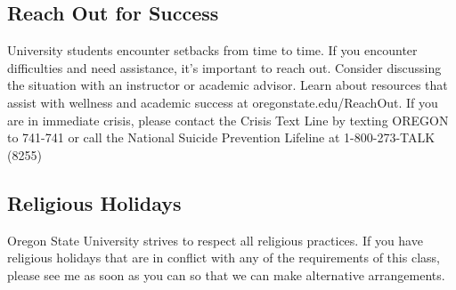 \documentclass[10pt]{article}
\begin{document}
\subsection*{Reach Out for Success}
University students encounter setbacks from time to time. If you encounter difficulties and need assistance, it’s important to reach out. Consider discussing the situation with an instructor or academic advisor. Learn about resources that assist with wellness and academic success at oregonstate.edu/ReachOut. If you are in immediate crisis, please contact the Crisis Text Line by texting OREGON to 741-741 or call the National Suicide Prevention Lifeline at 1-800-273-TALK (8255)

\subsection*{Religious Holidays}
Oregon State University strives to respect all religious practices.
If you have religious holidays that are in conflict with any of the requirements of this class, please see me
as soon as you can so that we can make alternative arrangements.
\end{document}
